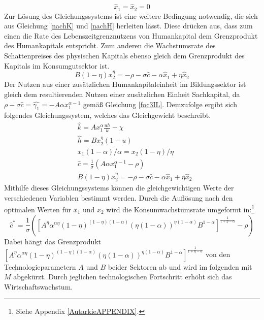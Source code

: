 %
\begin{equation}
	\hat{x}_1=\hat{x}_2=0
\end{equation}
%
Zur Lösung des Gleichungssystems ist eine weitere Bedingung notwendig, die sich aus Gleichung \eqref{nachK} und \eqref{nachH} herleiten lässt. Diese drücken aus, dass zum einen die Rate des Lebenszeitgrenznutzens von Humankapital dem Grenzprodukt des Humankapitals entspricht. Zum anderen die Wachstumsrate des Schattenpreises des physischen Kapitals ebenso gleich dem Grenzprodukt des Kapitals im Konsumgutsektor ist. 
%
\begin{equation}
	\boxed{B(1-\eta)x_2^\eta=-\rho-\sigma\hat{c}-\alpha\hat{x}_1+\eta\hat{x}_2}\label{A5}
\end{equation}
%
Der Nutzen aus einer zusätzlichen Humankapitaleinheit im Bildungssektor ist gleich dem resultierenden Nutzen einer zusätzlichen Einheit Sachkapital, da $\rho-\sigma\hat{c}=\hat{\gamma_1}=-A\alpha x_1^{\alpha-1}$ gemäß Gleichung \eqref{foc3IL}.
Demzufolge ergibt sich folgendes Gleichungssystem, welches das Gleichgewicht beschreibt.
%
\begin{align}
	&\hat{k}=Ax_1^\alpha \frac{uh}{k}-\chi\label{GG1WM}\\
	&\hat{h}=Bx_2^\eta(1-u)\label{GG2WM}\\
	& x_1(1-\alpha)/\alpha =x_2(1-\eta)/\eta\label{GG3WM}\\
	&\hat{c}=\frac{1}{\sigma}\left(A\alpha x_1^{\alpha -1}-\rho\right)\label{GG4WM}\\
	&B(1-\eta)x_2^\eta=-\rho-\sigma\hat{c}-\alpha\hat{x}_1+\eta\hat{x}_2\label{GG5WM}
\end{align}
%
Mithilfe dieses Gleichungssystems können die gleichgewichtigen Werte der verschiedenen Variablen bestimmt werden. Durch die Auflösung nach den optimalen Werten für $x_1$ und $x_2$ wird die Konsumwachstumsrate umgeformt in:\footnote{Siehe Appendix \ref{AutarkieAPPENDIX}.} 
%
\begin{equation}
	\boxed{\hat{c}^*=\frac{1}{\sigma}\left(\left[A^\eta\alpha^{\alpha\eta}(1-\eta)^{(1-\eta)(1-\alpha)}(\eta(1-\alpha))^{\eta(1-\alpha)}B^{1-\alpha}\right]^\frac{1}{1+\eta-\alpha}-\rho\right)}
\end{equation}
%
Dabei hängt das Grenzprodukt $\left[A^\eta\alpha^{\alpha\eta}(1-\eta)^{(1-\eta)(1-\alpha)}(\eta(1-\alpha))^{\eta(1-\alpha)}B^{1-\alpha}\right]^\frac{1}{1+\eta-\alpha}$ von den Technologieparametern $A$ und $B$ beider Sektoren ab und wird im folgenden mit $M$ abgekürzt. Durch jeglichen technologischen Fortschritt erhöht sich das Wirtschaftswachstum.\\
